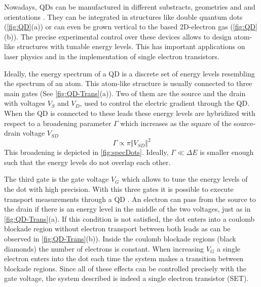   Nowadays, QDs can be manufactured in different substracts, geometries and  and orientations \citep{bimberg_quantum_1999}. They can be integrated in structures like double quantum dots (\ref{fig:QD}(a)) or can even be grown vertical to the based 2D-electron gas (\ref{fig:QD}(b)). The precise experimental control over these devices allows to design atom-like structures with tunable energy levels. This has important applications on laser physics and in the implementation of single electron transistors. 


  

   Ideally, the energy spectrum of a QD is a discrete set of energy levels resembling the spectrum of an atom. This atom-like structure is usually connected to three main gates (See \ref{fig:QD-Trans}(a)). Two of them are the source and the drain with voltages $V_S$ and $V_D$, used to control the electric gradient through the QD. When the QD is connected to these leads these energy levels are hybridized with respect to a broadening parameter $\Gamma$ which increases as the square of the source-drain voltage $V_{SD}$ 
\begin{equation}
    \Gamma \propto \pi \Vert V_{SD} \Vert^2
\end{equation}
\noindent This broadening is depicted in \ref{fig:specDots}. Ideally, $\Gamma \ll \Delta E$ is smaller enough such that the energy levels do not overlap each other. 

The third gate is the gate voltage $V_G$ which allows to tune the energy levels of the dot with high  precision. With this three gates it is possible to execute transport measurements through a QD . An electron can pass from the source to the drain if there is an energy level in the middle of the two voltages, just as in \ref{fig:QD-Trans}(a). If this condition is not satisfied,  the dot enters into a coulomb blockade region without  electron transport between both leads as can be observed in \ref{fig:QD-Trans}(b)). Inside the coulomb blockade regions (black diamonds) the number of electrons is constant. When increasing $V_G$ a single electron enters into the dot each time the system makes a transition between blockade regions. Since all of these effects can be controlled precisely with the gate voltage, the system described is indeed a single electron transistor (SET).  

